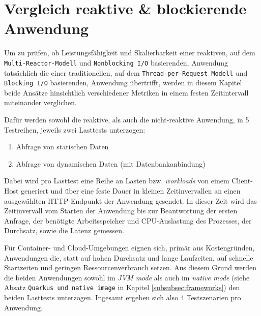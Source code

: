 \section {Vergleich reaktive \& blockierende Anwendung}
\label{section:vergleich_reaktiv_blockierend}
Um zu prüfen, ob Leistungsfähigkeit und Skalierbarkeit einer reaktiven, auf dem \newline
\verb|Multi-Reactor-Modell| und \verb|Nonblocking I/O| basierenden,
Anwendung tatsächlich die einer traditionellen, auf dem \verb|Thread-per-Request Modell| und \verb|Blocking I/O| basierenden, Anwendung übertrifft, werden in
diesem Kapitel beide Ansätze hinsichtlich verschiedener Metriken in einem festen Zeitintervall miteinander verglichen.

Dafür werden sowohl die reaktive, als auch die nicht-reaktive Anwendung, in 5 Testreihen, jeweils zwei Lasttests unterzogen:
\begin{enumerate}
    \item Abfrage von statischen Daten
    \item Abfrage von dynamischen Daten (mit Datenbankanbindung)
\end{enumerate}
Dabei wird pro Lasttest eine Reihe an Lasten bzw. \textit{workloads} von einem Client-Host generiert und über eine feste Dauer in kleinen Zeitinvervallen
an einen ausgewählten HTTP-Endpunkt der Anwendung gesendet.
In dieser Zeit wird das Zeitinvervall vom Starten der Anwendung bis zur Beantwortung der ersten Anfrage,
der benötigte Arbeitsspeicher und CPU-Auslastung des Prozesses, der Durchsatz, sowie die Latenz gemessen.

Für Container- und Cloud-Umgebungen eignen sich, primär aus Kostengründen, Anwendungen die, statt auf hohen Durchsatz und lange Laufzeiten, auf
schnelle Startzeiten und geringen Ressourcenverbrauch setzen.
Aus diesem Grund werden die beiden Anwendungen sowohl im \textit{JVM mode} als auch im \textit{native mode}
(siehe Absatz \verb|Quarkus und native image| in Kapitel \ref{subsubsec:frameworks})
den beiden Lasttests unterzogen. Ingesamt ergeben sich also 4 Testszenarien pro Anwendung.

